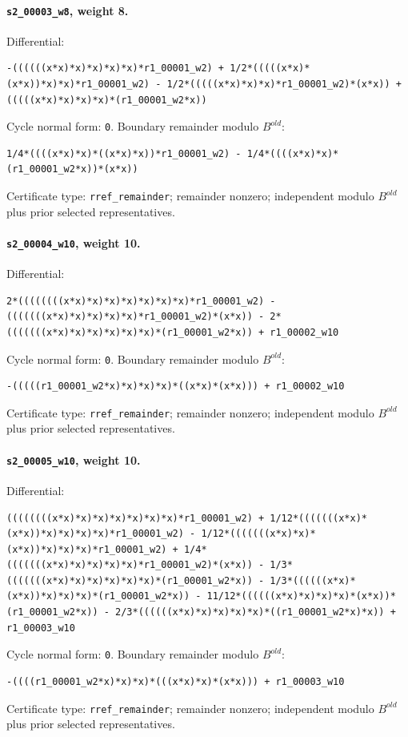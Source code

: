 \documentclass[11pt]{article}
\begin{document}
\paragraph{\texttt{s2\_00003\_w8}, weight 8.}
Differential:
\begin{lstlisting}
-((((((x*x)*x)*x)*x)*x)*r1_00001_w2) + 1/2*(((((x*x)*(x*x))*x)*x)*r1_00001_w2) - 1/2*(((((x*x)*x)*x)*r1_00001_w2)*(x*x)) + (((((x*x)*x)*x)*x)*(r1_00001_w2*x))
\end{lstlisting}
Cycle normal form: \texttt{0}.  Boundary remainder modulo \(B^{old}\):
\begin{lstlisting}
1/4*((((x*x)*x)*((x*x)*x))*r1_00001_w2) - 1/4*((((x*x)*x)*(r1_00001_w2*x))*(x*x))
\end{lstlisting}
Certificate type: \texttt{rref\_remainder}; remainder nonzero; independent
modulo \(B^{old}\) plus prior selected representatives.

\paragraph{\texttt{s2\_00004\_w10}, weight 10.}
Differential:
\begin{lstlisting}
2*((((((((x*x)*x)*x)*x)*x)*x)*x)*r1_00001_w2) - (((((((x*x)*x)*x)*x)*x)*r1_00001_w2)*(x*x)) - 2*(((((((x*x)*x)*x)*x)*x)*x)*(r1_00001_w2*x)) + r1_00002_w10
\end{lstlisting}
Cycle normal form: \texttt{0}.  Boundary remainder modulo \(B^{old}\):
\begin{lstlisting}
-(((((r1_00001_w2*x)*x)*x)*x)*((x*x)*(x*x))) + r1_00002_w10
\end{lstlisting}
Certificate type: \texttt{rref\_remainder}; remainder nonzero; independent
modulo \(B^{old}\) plus prior selected representatives.

\paragraph{\texttt{s2\_00005\_w10}, weight 10.}
Differential:
\begin{lstlisting}
((((((((x*x)*x)*x)*x)*x)*x)*x)*r1_00001_w2) + 1/12*(((((((x*x)*(x*x))*x)*x)*x)*x)*r1_00001_w2) - 1/12*(((((((x*x)*x)*(x*x))*x)*x)*x)*r1_00001_w2) + 1/4*(((((((x*x)*x)*x)*x)*x)*r1_00001_w2)*(x*x)) - 1/3*(((((((x*x)*x)*x)*x)*x)*x)*(r1_00001_w2*x)) - 1/3*((((((x*x)*(x*x))*x)*x)*x)*(r1_00001_w2*x)) - 11/12*((((((x*x)*x)*x)*x)*(x*x))*(r1_00001_w2*x)) - 2/3*((((((x*x)*x)*x)*x)*x)*((r1_00001_w2*x)*x)) + r1_00003_w10
\end{lstlisting}
Cycle normal form: \texttt{0}.  Boundary remainder modulo \(B^{old}\):
\begin{lstlisting}
-((((r1_00001_w2*x)*x)*x)*(((x*x)*x)*(x*x))) + r1_00003_w10
\end{lstlisting}
Certificate type: \texttt{rref\_remainder}; remainder nonzero; independent
modulo \(B^{old}\) plus prior selected representatives.
\end{document}
